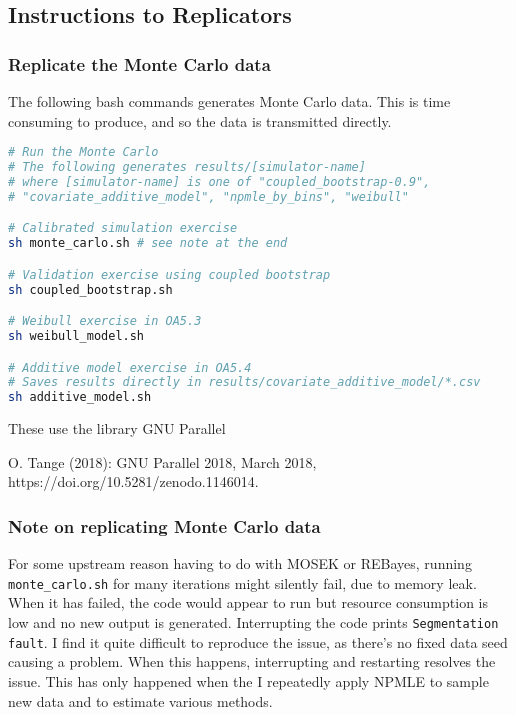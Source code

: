 \documentclass[10pt]{article}
\begin{document}

\hypertarget{instructions-to-replicators}{%
\subsection{Instructions to
Replicators}\label{instructions-to-replicators}}

\subsubsection*{Replicate the Monte Carlo data}

The following bash commands generates Monte Carlo data. This is time consuming to produce,
and so the data is transmitted directly. 

\begin{lstlisting}[language=bash]
# Run the Monte Carlo
# The following generates results/[simulator-name]
# where [simulator-name] is one of "coupled_bootstrap-0.9",
# "covariate_additive_model", "npmle_by_bins", "weibull"

# Calibrated simulation exercise
sh monte_carlo.sh # see note at the end

# Validation exercise using coupled bootstrap
sh coupled_bootstrap.sh

# Weibull exercise in OA5.3
sh weibull_model.sh

# Additive model exercise in OA5.4
# Saves results directly in results/covariate_additive_model/*.csv
sh additive_model.sh
\end{lstlisting}

These use the library GNU Parallel

O. Tange (2018): GNU Parallel 2018, March 2018, https://doi.org/10.5281/zenodo.1146014.

\subsubsection{Note on replicating Monte Carlo data}
  For some upstream reason having to do with MOSEK or REBayes, running
  \texttt{monte\_carlo.sh}
for many iterations might silently fail, due to memory leak. When it has failed, the code
would appear to run but resource consumption is low and no new output is generated.
Interrupting the code prints \texttt{Segmentation fault}. I find it quite difficult to
reproduce the issue, as there's no fixed data seed causing a problem. When this happens,
interrupting and restarting resolves the issue. This has only happened when the I
repeatedly apply NPMLE to sample new data and to estimate various methods.
\end{document}
